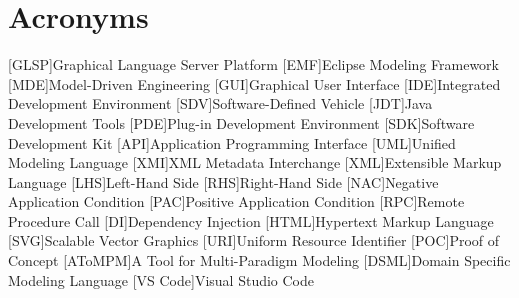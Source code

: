 \newpage
\section{Acronyms}
\label{sec:acronyms}
\begin{acronym}[AToMPM]
    [GLSP]{Graphical Language Server Platform}
    [EMF]{Eclipse Modeling Framework}
    [MDE]{Model-Driven Engineering}
    [GUI]{Graphical User Interface}
    [IDE]{Integrated Development Environment}
    [SDV]{Software-Defined Vehicle}
    [JDT]{Java Development Tools}
    [PDE]{Plug-in Development Environment}
    [SDK]{Software Development Kit}
    [API]{Application Programming Interface}
    [UML]{Unified Modeling Language}
    [XMI]{XML Metadata Interchange}
    [XML]{Extensible Markup Language}
    [LHS]{Left-Hand Side}
    [RHS]{Right-Hand Side}
    [NAC]{Negative Application Condition}
    [PAC]{Positive Application Condition}
    [RPC]{Remote Procedure Call}
    [DI]{Dependency Injection}
    [HTML]{Hypertext Markup Language}
    [SVG]{Scalable Vector Graphics}
    [URI]{Uniform Resource Identifier}
    [POC]{Proof of Concept}
    [AToMPM]{A Tool for Multi-Paradigm Modeling}
    [DSML]{Domain Specific Modeling Language}
    [VS Code]{Visual Studio Code}
  \end{acronym}